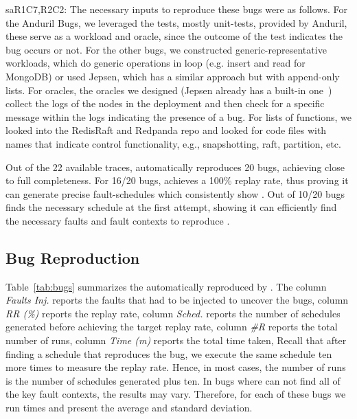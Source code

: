 sa{R1C7,R2C2:  The necessary inputs to reproduce these bugs were as follows. For the Anduril Bugs, we leveraged the tests, mostly unit-tests, provided by Anduril, these serve as a workload and oracle, since the outcome of the test indicates the bug occurs or not. For the other bugs, we constructed generic-representative workloads, which do generic operations in loop (e.g. insert and read for MongoDB) or used Jepsen, which has a similar approach but with append-only lists.
		For oracles, the oracles we designed (Jepsen already has a built-in one~\cite{elle}) collect the logs of the nodes in the deployment and then check for a specific message within the logs indicating the presence of a bug.
		For lists of functions, we looked into the RedisRaft and Redpanda repo and looked for code files with names that indicate control functionality, e.g., snapshotting, raft, partition, etc.}


 Out of the 22 available traces, \sys automatically reproduces 20 bugs, achieving close to full completeness.
For 16/20 bugs, \sys achieves a 100\% replay rate, thus proving it can generate precise fault-schedules which consistently show \efib.
Out of 10/20 bugs \sys finds the necessary schedule at the first attempt, showing it can efficiently find the necessary faults and fault contexts to reproduce \efib.



\subsection{Bug Reproduction}



Table~\ref{tab:bugs} summarizes the \efib automatically reproduced by \sys.
The column \emph{Faults Inj.} reports the faults that had to be injected to uncover the bugs, column \emph{RR (\%)} reports the replay rate, column \emph{Sched.} reports the number of schedules generated before achieving the target replay rate, column \emph{\#R} reports the total number of runs, column \emph{Time (m)} reports the total time taken, 
Recall that after finding a schedule that reproduces the bug, we execute the same schedule ten more times to measure the replay rate.
Hence, in most cases, the number of runs is the number of schedules generated plus ten.
In bugs where \sys can not find all of the key fault contexts, the results may vary. Therefore, for each of these bugs we run  times and present the average and standard deviation.

